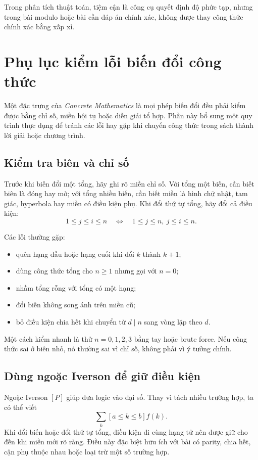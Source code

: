 \documentclass[11pt]{article}
\begin{document}
Trong phân tích thuật toán, tiệm cận là công cụ quyết định độ phức tạp, nhưng
trong bài modulo hoặc bài cần đáp án chính xác, không được thay công thức chính
xác bằng xấp xỉ.

\section{Phụ lục kiểm lỗi biến đổi công thức}

Một đặc trưng của \emph{Concrete Mathematics} là mọi phép biến đổi đều phải
kiểm được bằng chỉ số, miền hội tụ hoặc diễn giải tổ hợp. Phần này bổ sung một
quy trình thực dụng để tránh các lỗi hay gặp khi chuyển công thức trong sách
thành lời giải hoặc chương trình.

\subsection{Kiểm tra biên và chỉ số}

Trước khi biến đổi một tổng, hãy ghi rõ miền chỉ số. Với tổng một biến, cần biết
biên là đóng hay mở; với tổng nhiều biến, cần biết miền là hình chữ nhật, tam
giác, hyperbola hay miền có điều kiện phụ. Khi đổi thứ tự tổng, hãy đổi cả điều
kiện:
\[
  1\le j\le i\le n
  \quad\Longleftrightarrow\quad
  1\le j\le n,\ j\le i\le n.
\]

Các lỗi thường gặp:
\begin{itemize}
  \item quên hạng đầu hoặc hạng cuối khi đổi \(k\) thành \(k+1\);
  \item dùng công thức tổng cho \(n\ge1\) nhưng gọi với \(n=0\);
  \item nhầm tổng rỗng với tổng có một hạng;
  \item đổi biến không song ánh trên miền cũ;
  \item bỏ điều kiện chia hết khi chuyển từ \(d\mid n\) sang vòng lặp theo \(d\).
\end{itemize}

Một cách kiểm nhanh là thử \(n=0,1,2,3\) bằng tay hoặc brute force. Nếu công
thức sai ở biên nhỏ, nó thường sai vì chỉ số, không phải vì ý tưởng chính.

\subsection{Dùng ngoặc Iverson để giữ điều kiện}

Ngoặc Iverson \([P]\) giúp đưa logic vào đại số. Thay vì tách nhiều trường hợp,
ta có thể viết
\[
  \sum_k [a\le k\le b] f(k).
\]
Khi đổi biến hoặc đổi thứ tự tổng, điều kiện đi cùng hạng tử nên được giữ cho
đến khi miền mới rõ ràng. Điều này đặc biệt hữu ích với bài có parity, chia
hết, cận phụ thuộc nhau hoặc loại trừ một số trường hợp.
\end{document}
